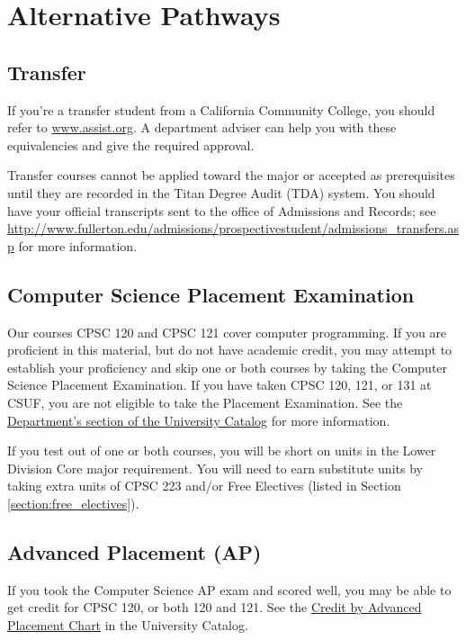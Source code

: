 \documentclass{book}
\newcommand{\CampusName}{CSUF}
\begin{document}
\chapter{Alternative Pathways}

\section{Transfer}

If you're a transfer student from a California Community College, you should refer to \url{www.assist.org}. A department adviser can help you with these equivalencies and give the required approval.

Transfer courses cannot be applied toward the major or accepted as prerequisites until they are recorded in the Titan Degree Audit (TDA) system. You should have your official transcripts sent to the office of Admissions and Records; see \url{http://www.fullerton.edu/admissions/prospectivestudent/admissions_transfers.asp} for more information.

\section{Computer Science Placement Examination}
\label{section:placement}
Our courses CPSC 120 and CPSC 121 cover computer programming. If you are proficient in this material, but do not have academic credit, you may attempt to establish your proficiency and skip one or both courses by taking the Computer Science Placement Examination. If you have taken CPSC 120, 121, or 131 at \CampusName, you are not eligible to take the Placement Examination. See the \href{http://catalog.fullerton.edu/preview_program.php?catoid=2&poid=537&returnto=137}{Department's section of the University Catalog} for more information.

If you test out of one or both courses, you will be short on units in the Lower Division Core major requirement. You will need to earn substitute units by taking extra units of CPSC 223 and/or Free Electives (listed in Section \ref{section:free_electives}).

\section{Advanced Placement (AP)}
\label{section:ap}
If you took the Computer Science AP exam and scored well, you may be able to get credit for CPSC 120, or both 120 and 121. See the \href{http://catalog.fullerton.edu/content.php?catoid=2&navoid=153#Credit%20by%20Advanced%20Placement%20Chart}{Credit by Advanced Placement Chart} in the University Catalog.
\end{document}
